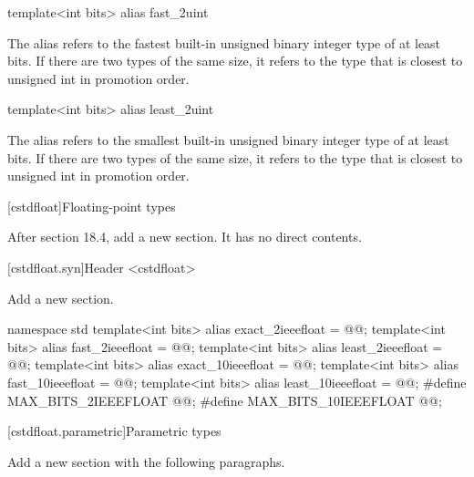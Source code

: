 \begin{addedblock}
\begin{itemdecl}
template<int bits> alias fast_2uint    
\end{itemdecl}

\begin{itemdescr}
The alias  refers to the fastest built-in unsigned binary integer type of at least  bits. If there are two types of the same size, it refers to the type that is closest to unsigned int in promotion order.    
\end{itemdescr} 

\begin{itemdecl}
template<int bits> alias least_2uint    
\end{itemdecl}

\begin{itemdescr}
The alias  refers to the smallest built-in unsigned binary integer type of at least  bits. If there are two types of the same size, it refers to the type that is closest to unsigned int in promotion order.    
\end{itemdescr}    
\end{addedblock}

[cstdfloat]{Floating-point types}

After section 18.4, add a new section. It has no direct contents.

[cstdfloat.syn]{Header <cstdfloat>}

Add a new section.

\begin{addedblock}
    \begin{codeblock}
namespace std {
  template<int bits> alias exact_2ieeefloat = @\impdefx{}@;
  template<int bits> alias fast_2ieeefloat = @\impdefx{}@;
  template<int bits> alias least_2ieeefloat = @\impdefx{}@;
  template<int bits> alias exact_10ieeefloat = @\impdefx{}@;
  template<int bits> alias fast_10ieeefloat = @\impdefx{}@;
  template<int bits> alias least_10ieeefloat = @\impdefx{}@;
}
#define MAX_BITS_2IEEEFLOAT @\impdefx{}@;
#define MAX_BITS_10IEEEFLOAT @\impdefx{}@;
    \end{codeblock}    
\end{addedblock}

[cstdfloat.parametric]{Parametric types}

Add a new section with the following paragraphs.

